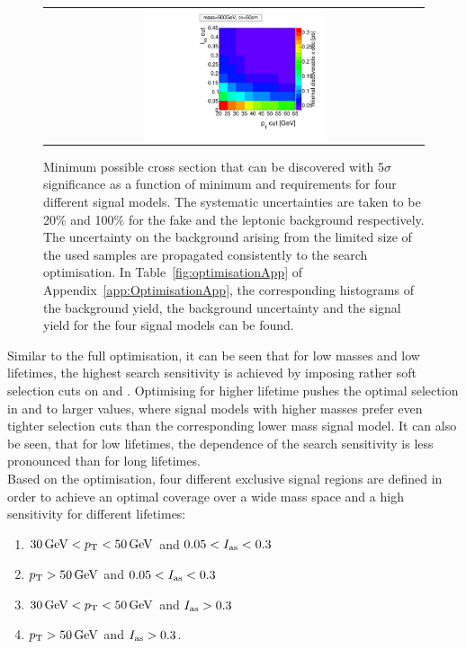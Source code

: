 \begin{figure}[!h]
\begin{tabular}{c}
    \includegraphics[width=0.49\textwidth]{figures/analysis/Optimisation/Madgraph_signal_mass_500_ctau_50cm_ECaloLe5_SOverDeltaBStatPlusSys.pdf} 
  \end{tabular}
  \caption{Minimum possible cross section that can be discovered with 5$\sigma$ significance as a function of minimum \pt and \ias requirements for four different signal models.
           The systematic uncertainties are taken to be 20\% and 100\% for the fake and the leptonic background respectively.
           The uncertainty on the background arising from the limited size of the used samples are propagated consistently to the search optimisation.
           In Table~\ref{fig:optimisationApp} of Appendix~\ref{app:OptimisationApp}, the corresponding histograms of the background yield, the background uncertainty and the signal yield for the four signal models can be found.}
  \vspace{10pt}
  \label{fig:optimisation}
\end{figure}
Similar to the full optimisation, it can be seen that for low masses and low lifetimes, the highest search sensitivity is achieved by imposing rather soft selection cuts on \ias and \pt.
Optimising for higher lifetime pushes the optimal selection in \pt and \ias to larger values, where signal models with higher masses prefer even tighter \ias selection cuts than the corresponding lower mass signal model.
It can also be seen, that for low lifetimes, the \pt dependence of the search sensitivity is less pronounced than for long lifetimes.\\


Based on the optimisation, four different exclusive signal regions are defined in order to achieve an optimal coverage over a wide mass space and a high sensitivity for different lifetimes:
\begin{enumerate}[1.)]
\item $30\,\text{Ge}\kern-0.06667em\text{V}<p_{\text{T}}<50\,\text{Ge}\kern-0.06667em\text{V}$ and $0.05<I_{\text{as}}<0.3$
\item $p_{\text{T}}>50\,\text{Ge}\kern-0.06667em\text{V}$ and $0.05<I_{\text{as}}<0.3$
\item $30\,\text{Ge}\kern-0.06667em\text{V}<p_{\text{T}}<50\,\text{Ge}\kern-0.06667em\text{V}$ and $I_{\text{as}}>0.3$
\item $p_{\text{T}}>50\,\text{Ge}\kern-0.06667em\text{V}$ and $I_{\text{as}}>0.3$.
\end{enumerate}


